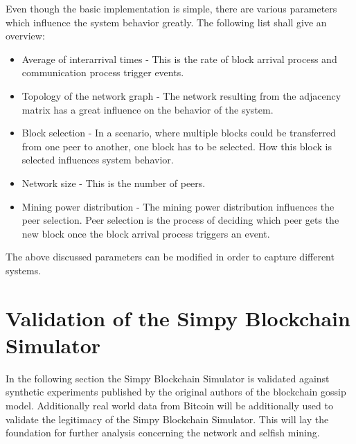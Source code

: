 Even though the basic implementation is simple, there are various parameters which influence the system behavior greatly. The following list shall give an overview:
\begin{itemize}
\item Average of interarrival times - This is the rate of block arrival process and communication process trigger events. 
\item Topology of the network graph - The network resulting from the adjacency matrix has a great influence on the behavior of the system.
\item Block selection - In a scenario, where multiple blocks could be transferred from one peer to another, one block has to be selected. How this block is selected influences system behavior.
\item Network size - This is the number of peers.
\item Mining power distribution - The mining power distribution influences the peer selection. Peer selection is the process of deciding which peer gets the new block once the block arrival process triggers an event.
\end{itemize}
The above discussed parameters can be modified in order to capture different systems.

\section{Validation of the Simpy Blockchain Simulator}
In the following section the Simpy Blockchain Simulator is validated against synthetic experiments published by the original authors of the blockchain gossip model. Additionally real world data from Bitcoin will be additionally used to validate the legitimacy of the Simpy Blockchain Simulator. This will lay the foundation for further analysis concerning the network and selfish mining. 
